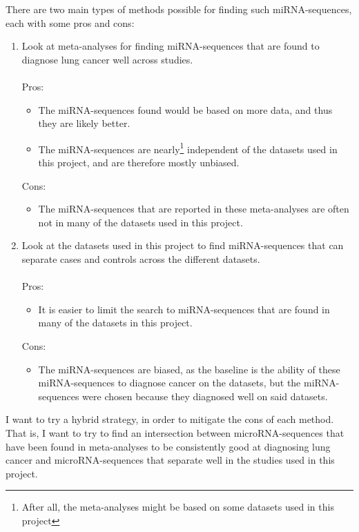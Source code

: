 {{{{{There are two main types of methods possible for finding such miRNA-sequences, each with some pros and cons:
\begin{enumerate}
    \item Look at meta-analyses for finding miRNA-sequences that are found to diagnose lung cancer well across studies. \\\\
        Pros:
        \begin{itemize}
            \item The miRNA-sequences found would be based on more data, and thus they are likely better.
            \item The miRNA-sequences are nearly\footnote{After all, the meta-analyses might be based on some datasets used in this project} independent of the datasets used in this project, and are therefore mostly unbiased.
        \end{itemize}
        Cons:
        \begin{itemize}
            \item The miRNA-sequences that are reported in these meta-analyses are often not in many of the datasets used in this project.
        \end{itemize}
    \item Look at the datasets used in this project to find miRNA-sequences that can separate cases and controls across the different datasets. \\\\
        Pros:
        \begin{itemize}
            \item It is easier to limit the search to miRNA-sequences that are found in many of the datasets in this project.
        \end{itemize}
        Cons:
        \begin{itemize}
            \item The miRNA-sequences are biased, as the baseline is the ability of these miRNA-sequences to diagnose cancer on the datasets, but the miRNA-sequences were chosen because they diagnosed well on said datasets.
        \end{itemize}
\end{enumerate}

I want to try a hybrid strategy, in order to mitigate the cons of each method. That is, I want to try to find an intersection between microRNA-sequences that have been found in meta-analyses to be consistently good at diagnosing lung cancer and microRNA-sequences that separate well in the studies used in this project.

}}}}}
